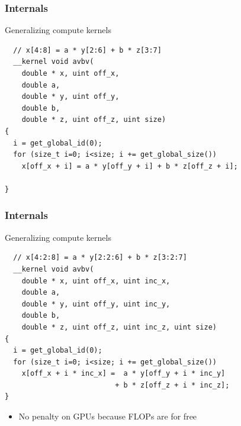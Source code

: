 \begin{frame}[fragile]
\frametitle{Internals}

 \begin{block}{Generalizing compute kernels}
  \begin{lstlisting}
  // x[4:8] = a * y[2:6] + b * z[3:7]
  __kernel void avbv(
    double * x, uint off_x,
    double a,
    double * y, uint off_y,
    double b,
    double * z, uint off_z, uint size)
{
  i = get_global_id(0);
  for (size_t i=0; i<size; i += get_global_size())
    x[off_x + i] = a * y[off_y + i] + b * z[off_z + i]; 

}
  \end{lstlisting}
 \end{block}

 \vspace*{1.5cm}
\end{frame}



\begin{frame}[fragile]
\frametitle{Internals}

 \begin{block}{Generalizing compute kernels}
  \begin{lstlisting}
  // x[4:2:8] = a * y[2:2:6] + b * z[3:2:7]
  __kernel void avbv(
    double * x, uint off_x, uint inc_x,
    double a,
    double * y, uint off_y, uint inc_y,
    double b,
    double * z, uint off_z, uint inc_z, uint size)
{
  i = get_global_id(0);
  for (size_t i=0; i<size; i += get_global_size())
    x[off_x + i * inc_x] =  a * y[off_y + i * inc_y]
                          + b * z[off_z + i * inc_z]; 
}
  \end{lstlisting}
 \end{block}

  \begin{block}{}
   \begin{itemize}
    \item No penalty on GPUs because FLOPs are for free
   \end{itemize}
  \end{block}

\end{frame}



